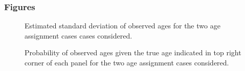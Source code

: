 \documentclass[11pt]{book}
\begin{document}
\hypertarget{figures-1}{%
\subsubsection{Figures}\label{figures-1}}
\begin{figure}[htb]

{\centering {} 

}

\caption{Estimated standard deviation of observed ages for the two age assignment cases cases considered.}\label{fig:unnamed-chunk-33}
\end{figure}
\newpage
\begin{figure}[htb]

{\centering {} 

}

\caption{Probability of observed ages given the true age indicated in top right corner of each panel for the two age assignment cases considered.}\label{fig:unnamed-chunk-34}
\end{figure}
\end{document}
